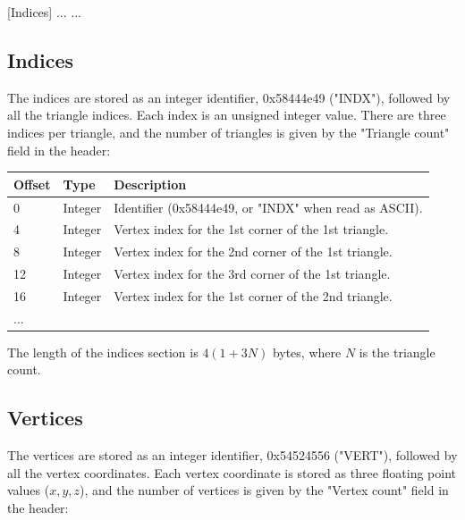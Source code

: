 [Indices]\newline
[Vertices]\newline
[Normals]\newline
[UV map 0]\newline
[UV map 1]\newline
...\newline
[UV map N]\newline
...

\subsection{Indices}
The indices are stored as an integer identifier, 0x58444e49 ("INDX"), followed
by all the triangle indices. Each index is an unsigned integer value. There are
three indices per triangle, and the number of triangles is given by the
"Triangle count" field in the header:

\begin{tabular}{|l|l|l|}\hline
\textbf{Offset} &  \textbf{Type} & \textbf{Description}\\ \hline
0 & Integer & Identifier (0x58444e49, or "INDX" when read as ASCII).\\ \hline
4 & Integer & Vertex index for the 1st corner of the 1st triangle.\\ \hline
8 & Integer & Vertex index for the 2nd corner of the 1st triangle.\\ \hline
12 & Integer & Vertex index for the 3rd corner of the 1st triangle.\\ \hline
16 & Integer & Vertex index for the 1st corner of the 2nd triangle.\\ \hline
... & & \\ \hline
\end{tabular}

The length of the indices section is $4(1+3N)$ bytes, where $N$ is the triangle
count.

\subsection{Vertices}
The vertices are stored as an integer identifier, 0x54524556 ("VERT"), followed
by all the vertex coordinates. Each vertex coordinate is stored as three
floating point values ($x,y,z$), and the number of vertices is given by the
"Vertex count" field in the header:


